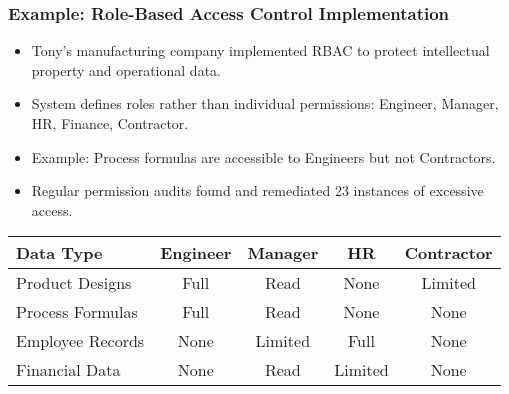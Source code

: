 \documentclass{beamer}
\begin{document}
    
\begin{frame}
    \frametitle{Example: Role-Based Access Control Implementation}
    \begin{itemize}
        \item Tony's manufacturing company implemented RBAC to protect intellectual property and operational data.
        \item System defines roles rather than individual permissions: Engineer, Manager, HR, Finance, Contractor.
        \item Example: Process formulas are accessible to Engineers but not Contractors.
        \item Regular permission audits found and remediated 23 instances of excessive access.
    \end{itemize}
    
    \scriptsize
    \begin{table}
    \begin{tabular}{|l|c|c|c|c|}
    \hline
    \textbf{Data Type} & \textbf{Engineer} & \textbf{Manager} & \textbf{HR} & \textbf{Contractor} \\
    \hline
    Product Designs & Full & Read & None & Limited \\
    \hline
    Process Formulas & Full & Read & None & None \\
    \hline
    Employee Records & None & Limited & Full & None \\
    \hline
    Financial Data & None & Read & Limited & None \\
    \hline
    \end{tabular}
    \end{table}
    \end{frame}
    
\end{document}

